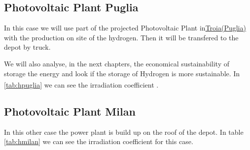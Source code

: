 

\subsection{Photovoltaic Plant Puglia}
In this case we will use part of the projected Photovoltaic Plant in\href{https://goo.gl/maps/HDedbnQQh3Apqn599}{Troia(Puglia)} with the production on site of the hydrogen. Then it will be transfered to the depot by truck.

We will also analyse, in the next chapters, the economical sustainability of storage the energy and look if the storage of Hydrogen is more sustainable. In \ref{tab:hpuglia} we can see the irradiation coefficient \textsuperscript{\cite{PVINFOSYSTEM}}.



\subsection{Photovoltaic Plant Milan}
In this other case the power plant is build up on the roof of the depot. In table \ref{tab:hmilan} we can see the irradiation coefficient for this case.
